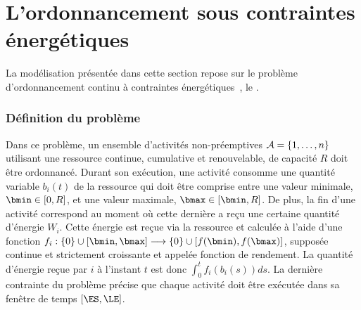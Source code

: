 
\section{L'ordonnancement sous contraintes énergétiques}
\label{sec:ordo_nrj} 
La modélisation présentée dans cette section repose sur le problème
d'ordonnancement continu à contraintes
énergétiques~\cite{ArtiguesLopez}, le \CECSP.

\subsubsection{Définition du problème}

Dans ce problème, un ensemble d'activités non-préemptives
${\cal A}=\{1,\dots,n\}$ utilisant une ressource continue, cumulative et
renouvelable, de capacité $R$ doit être ordonnancé. Durant son
exécution, une activité consomme une quantité variable $b_i(t)$ de la
ressource qui doit être comprise entre une valeur minimale, $\bmin \in
[0,R]$, et une valeur maximale, $\bmax \in [\bmin,R]$. De plus, la fin
d'une activité correspond au moment où cette dernière a reçu une
certaine quantité d'énergie $W_i$. Cette énergie est reçue via la
ressource et calculée à l'aide d'une fonction $f_i: \{0\} \cup
[\bmin,\bmax]\longrightarrow\{0\} \cup [f(\bmin),f(\bmax)]$, supposée
continue et strictement croissante et appelée fonction de rendement. La quantité
d'énergie reçue par $i$ à l'instant $t$ est donc $\int_{0}^t
f_i(b_i(s))ds$. La dernière contrainte du problème précise que chaque activité doit
être exécutée dans sa fenêtre de temps $[\ES,\LE]$.

